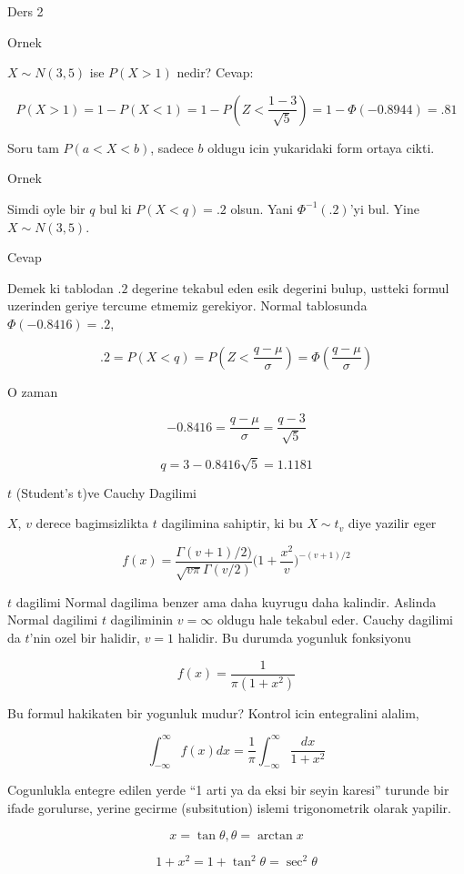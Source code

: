 \documentclass[12pt,fleqn]{article}\usepackage{../common}
\begin{document}
Ders 2

Ornek 

$X \sim N(3,5)$ ise $P(X > 1)$ nedir? Cevap:

\[ P(X>1) = 1 - P(X < 1) = 1 - P( Z < \frac{ 1 - 3}{\sqrt{5 }}) = 
1 - \Phi(-0.8944) = .81
 \]

Soru tam $P(a  < X < b)$, sadece $b$ oldugu icin yukaridaki form ortaya
cikti. 

Ornek 

Simdi oyle bir $q$ bul ki $P(X < q) = .2$ olsun. Yani $\Phi^{-1}(.2)$'yi
bul. Yine $X \sim N(3,5)$. 

Cevap 

Demek ki tablodan $.2$ degerine tekabul eden esik degerini bulup, ustteki
formul uzerinden geriye tercume etmemiz gerekiyor. Normal tablosunda
$\Phi(-0.8416) = .2$, 

\[ .2 = P(X<q) = P( Z < \frac{ q - \mu}{\sigma}) = \Phi(\frac{ q - \mu}{\sigma})
\]

O zaman 

\[ -0.8416 = \frac{q - \mu}{\sigma} = \frac{ q - 3}{\sqrt{ 5}} \]

\[ q = 3 - 0.8416 \sqrt{ 5} = 1.1181 \]

$t$ (Student's t)ve Cauchy Dagilimi 

$X$, $v$ derece bagimsizlikta $t$ dagilimina sahiptir, ki bu $X \sim t_v$
diye yazilir eger 

\[ f(x) = 
\frac{ \Gamma(v+1)/2)} {\sqrt{v\pi}\Gamma(v/2)}
\bigg(1 + \frac{ x^2}{v}\bigg)^{-(v+1)/2}
 \]

$t$ dagilimi Normal dagilima benzer ama daha kuyrugu daha kalindir. Aslinda
Normal dagilimi $t$ dagiliminin $v = \infty$ oldugu hale tekabul
eder. Cauchy dagilimi da $t$'nin ozel bir halidir, $v = 1$ halidir. Bu
durumda yogunluk fonksiyonu

\[ f(x)  = \frac{ 1}{\pi(1+ x^2)} \]

Bu formul hakikaten bir yogunluk mudur? Kontrol icin entegralini alalim, 

\[ \int _{ -\infty}^{\infty} f(x) dx = 
\frac{ 1}{\pi} \int _{ -\infty}^{\infty} \frac{ dx}{1 + x^2} 
 \]

Cogunlukla entegre edilen yerde  ``1 arti ya da eksi bir seyin karesi''
turunde  bir ifade gorulurse, yerine gecirme (subsitution) islemi
trigonometrik  olarak  yapilir. 

\[  x = \tan \theta, \theta = \arctan x \]

\[ 1 + x^2 = 1 + \tan^2\theta = \sec^2\theta\]
\end{document}
